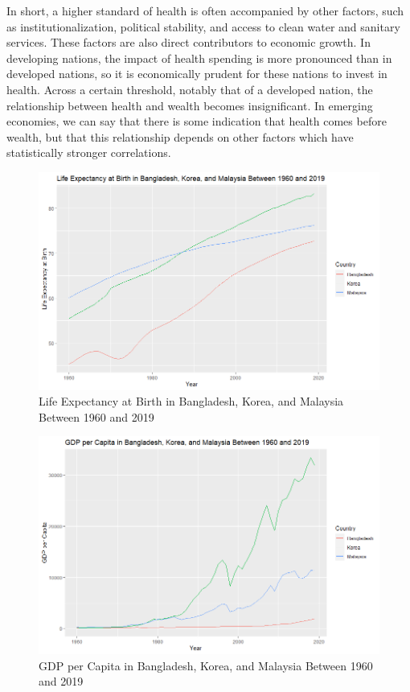 \documentclass[15pt]{article}
\begin{document}
In short, a higher standard of health is often accompanied by other factors, such as institutionalization, political stability, and access to clean water and sanitary services. These factors are also direct contributors to economic growth. In developing nations, the impact of health spending is more pronounced than in developed nations, so it is economically prudent for these nations to invest in health. Across a certain threshold, notably that of a developed nation, the relationship between health and wealth becomes insignificant. In emerging economies, we can say that there is some indication that health comes before wealth, but that this relationship depends on other factors which have statistically stronger correlations.

\begin{figure}[H]
    \centering
    \includegraphics[scale = 0.7]{Part4_Life.png}
    \caption{Life Expectancy at Birth in Bangladesh, Korea, and Malaysia Between 1960 and 2019}
\end{figure}

\begin{figure}[H]
    \centering
    \includegraphics[scale = 0.7]{Part4_GDP.png}
    \caption{GDP per Capita in Bangladesh, Korea, and Malaysia Between 1960 and 2019}
\end{figure}
\end{document}
